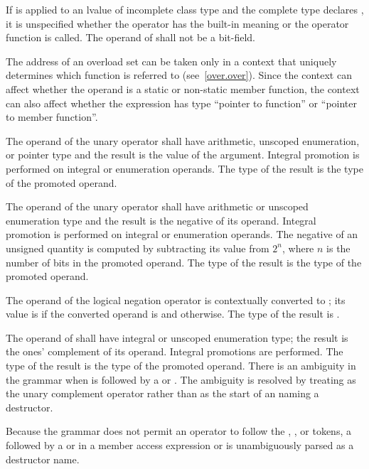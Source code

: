 \pnum
If \tcode{\&} is applied to an lvalue of incomplete class type and the
complete type declares , it is unspecified whether
the operator has the built-in meaning or the operator function is
called. The operand of \tcode{\&} shall not be a bit-field.

\pnum
{}%
\begin{note}
The address of an overload set can be taken
only in a context that uniquely determines
which function is referred to (see~\ref{over.over}).
Since the context can affect whether the operand is a static or
non-static member function, the context can also affect whether the
expression has type ``pointer to function'' or ``pointer to member
function''.
\end{note}

\pnum
{}%
The operand of the unary \tcode{+} operator shall have arithmetic, unscoped
enumeration, or pointer type and the result is the value of the
argument. Integral promotion is performed on integral or enumeration
operands. The type of the result is the type of the promoted operand.

\pnum
{}%
The operand of the unary \tcode{-} operator shall have arithmetic or unscoped
enumeration type and the result is the negative of its operand. Integral
promotion is performed on integral or enumeration operands. The negative
of an unsigned quantity is computed by subtracting its value from $2^n$,
where $n$ is the number of bits in the promoted operand. The type of the
result is the type of the promoted operand.

\pnum
{}%
The operand of the logical negation operator \tcode{!} is contextually
converted to ;
its value is 
if the converted operand is  and  otherwise.
The type of the result is .

\pnum
{}%
%
The operand of \tcode{\~{}} shall have integral or unscoped enumeration type; the
result is the ones' complement of its operand. Integral promotions are
performed. The type of the result is the type of the promoted operand.
There is an ambiguity
in the grammar when \tcode{\~{}} is followed by
a  or .
The ambiguity is resolved by treating \tcode{\~{}} as the unary complement
operator rather than as the start of an 
naming a destructor.
\begin{note}
Because the grammar does not permit an operator to follow the
, \tcode{->}, or \tcode{::} tokens, a \tcode{\~{}} followed by
a  or  in a
member access expression or  is
unambiguously parsed as a destructor name.
\end{note}

